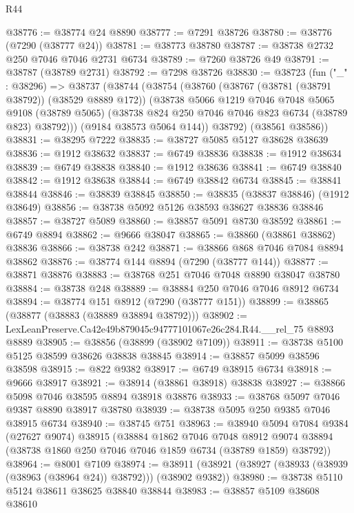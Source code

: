 \begin{lexlean}{R44}
\begin{coremodule}
{@38776 := @38774 @24 @8890
@38777 := @7291 @38726
@38780 := @38776 (@7290 (@38777 @24))
@38781 := @38773 @38780
@38787 := @38738 @2732 @250 @7046 @7046 @2731 @6734
@38789 := @7260 @38726 @49
@38791 := @38787 (@38789 @2731)
@38792 := @7298 @38726
@38830 := @38723
    (fun ("_" : @38296) =>
    @38737
      (@38744
        (@38754
          (@38760
            (@38767 (@38781 (@38791 @38792)) (@38529 @8889 @172))
            (@38738
              @5066
              @1219
              @7046
              @7048
              @5065
              @9108
              (@38789 @5065)
              (@38738 @824 @250 @7046 @7046 @823 @6734 (@38789 @823) @38792)))
          (@9184 @38573 @5064 @144))
        @38792)
      (@38561 @38586))
@38831 := @38295 @7222
@38835 := @38727 @5085 @5127 @38628 @38639
@38836 := @1912 @38632
@38837 := @6749 @38836
@38838 := @1912 @38634
@38839 := @6749 @38838
@38840 := @1912 @38636
@38841 := @6749 @38840
@38842 := @1912 @38638
@38844 := @6749 @38842 @6734
@38845 := @38841 @38844
@38846 := @38839 @38845
@38850 := @38835 (@38837 @38846) (@1912 @38649)
@38856 := @38738 @5092 @5126 @38593 @38627 @38836 @38846
@38857 := @38727 @5089
@38860 := @38857 @5091 @8730 @38592
@38861 := @6749 @8894
@38862 := @9666 @38047
@38865 := @38860 (@38861 @38862) @38836
@38866 := @38738 @242
@38871 := @38866 @868 @7046 @7084 @8894 @38862
@38876 := @38774 @144 @8894 (@7290 (@38777 @144))
@38877 := @38871 @38876
@38883 := @38768 @251 @7046 @7048 @8890 @38047 @38780
@38884 := @38738 @248
@38889 := @38884 @250 @7046 @7046 @8912 @6734
@38894 := @38774 @151 @8912 (@7290 (@38777 @151))
@38899 := @38865 (@38877 (@38883 (@38889 @38894 @38792)))
@38902 := LexLeanPreserve.Ca42e49b879045c94777101067e26c284.R44.__rel_75 @8893 @8889
@38905 := @38856 (@38899 (@38902 @7109))
@38911 := @38738 @5100 @5125 @38599 @38626 @38838 @38845
@38914 := @38857 @5099 @38596 @38598
@38915 := @822 @9382
@38917 := @6749 @38915 @6734
@38918 := @9666 @38917
@38921 := @38914 (@38861 @38918) @38838
@38927 := @38866 @5098 @7046 @38595 @8894 @38918 @38876
@38933 := @38768 @5097 @7046 @9387 @8890 @38917 @38780
@38939 := @38738 @5095 @250 @9385 @7046 @38915 @6734
@38940 := @38745 @751
@38963 := @38940
    @5094
    @7084
    @9384
    (@27627 @9074)
    @38915
    (@38884
      @1862
      @7046
      @7048
      @8912
      @9074
      @38894
      (@38738 @1860 @250 @7046 @7046 @1859 @6734 (@38789 @1859) @38792))
@38964 := @8001 @7109
@38974 := @38911 (@38921 (@38927 (@38933 (@38939 (@38963 (@38964 @24)) @38792))) (@38902 @9382))
@38980 := @38738 @5110 @5124 @38611 @38625 @38840 @38844
@38983 := @38857 @5109 @38608 @38610
}
\end{coremodule}
\end{lexlean}
